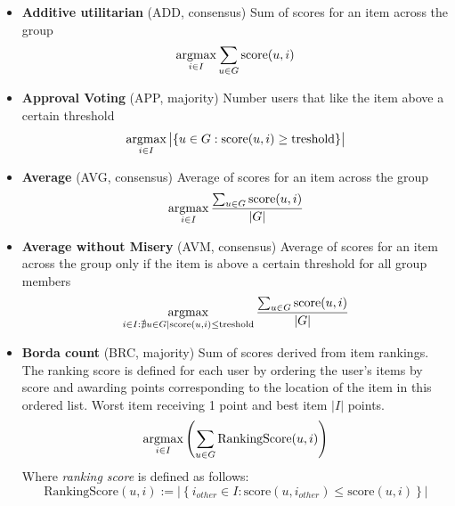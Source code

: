 \begin{itemize}
    \item \textbf{Additive utilitarian} (ADD, consensus)\newline
        Sum of scores for an item across the group
        \begin{equation}
            \operatorname*{argmax}_{i \in I}{\sum_{u \in G}{\textrm{score}(u,i)}}
        \end{equation}
    
    \item \textbf{Approval Voting} (APP, majority)\newline
        Number users that like the item above a certain threshold
        \begin{equation}
            \operatorname*{argmax}_{i \in I}{
                \big\lvert{\left\{
                    u \in G : \textrm{score}(u,i) \geq \textrm{treshold}
                \right\}}\big\rvert
            }
        \end{equation}
    
    \item \textbf{Average} (AVG, consensus)\newline
        Average of scores for an item across the group
        \begin{equation}
            \operatorname*{argmax}_{i \in I}{\dfrac{\sum_{u \in G}{\textrm{score}(u,i)}}{\left\lvert{G}\right\rvert}}
        \end{equation}
    
    \item \textbf{Average without Misery} (AVM, consensus)\newline
        Average of scores for an item across the group only if the item is above a certain threshold for all group members
        \begin{equation}
            \operatorname*{argmax}_{ i \in I : \nexists u \in G | \textrm{score}(u,i) \leq \textrm{treshold}}{
                \dfrac{\sum_{u \in G}{\textrm{score}(u,i)}}{\left\lvert{G}\right\rvert}
            }
        \end{equation}
        
    \item \textbf{Borda count} (BRC, majority)\newline
        Sum of scores derived from item rankings. The ranking score is defined for each user by ordering the user's items by score and awarding points corresponding to the location of the item in this ordered list. Worst item receiving 1 point and best item $|I|$ points.
        \begin{equation}
                \operatorname*{argmax}_{i \in I}{\left(\sum_{u \in G}{\textrm{RankingScore}(u,i)}\right)}
            \end{equation}
        Where \textit{ranking score} is defined as follows:
        \begin{equation*}
            \textrm{RankingScore}(u,i) := 
            \big\lvert{\left\{
                i_{other} \in I : \textrm{score}(u,i_{other}) \leq \textrm{score}(u,i)
            \right\}}\big\rvert
        \end{equation*}
    

\end{itemize}
